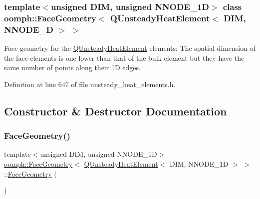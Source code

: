 \subsubsection*{template$<$unsigned D\+IM, unsigned N\+N\+O\+D\+E\+\_\+1D$>$\newline
class oomph\+::\+Face\+Geometry$<$ Q\+Unsteady\+Heat\+Element$<$ D\+I\+M, N\+N\+O\+D\+E\+\_\+D $>$ $>$}

Face geometry for the \hyperlink{classoomph_1_1QUnsteadyHeatElement}{Q\+Unsteady\+Heat\+Element} elements\+: The spatial dimension of the face elements is one lower than that of the bulk element but they have the same number of points along their 1D edges. 

Definition at line 647 of file unsteady\+\_\+heat\+\_\+elements.\+h.



\subsection{Constructor \& Destructor Documentation}
\mbox{\label{classoomph_1_1FaceGeometry_3_01QUnsteadyHeatElement_3_01DIM_00_01NNODE__1D_01_4_01_4_a529e4a591d38ef1f613cf65159257ccc}} 
\subsubsection{\texorpdfstring{Face\+Geometry()}{FaceGeometry()}}
{\footnotesize\ttfamily template$<$unsigned D\+IM, unsigned N\+N\+O\+D\+E\+\_\+1D$>$ \\
\hyperlink{classoomph_1_1FaceGeometry}{oomph\+::\+Face\+Geometry}$<$ \hyperlink{classoomph_1_1QUnsteadyHeatElement}{Q\+Unsteady\+Heat\+Element}$<$ D\+IM, N\+N\+O\+D\+E\+\_\+1D $>$ $>$\+::\hyperlink{classoomph_1_1FaceGeometry}{Face\+Geometry} (\begin{DoxyParamCaption}{ }\end{DoxyParamCaption})\hspace{0.3cm}{\ttfamily [inline]}}




